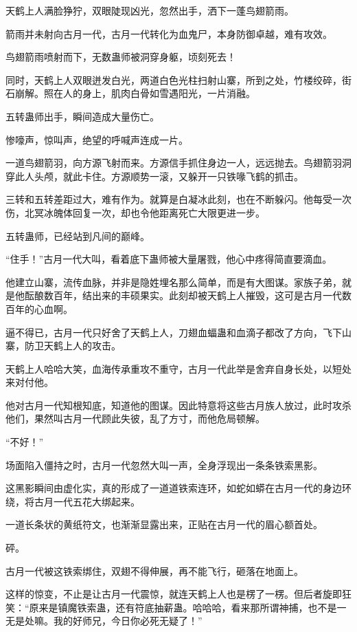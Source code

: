 
\begin{this_body}

天鹤上人满脸狰狞，双眼陡现凶光，忽然出手，洒下一蓬鸟翅箭雨。

箭雨并未射向古月一代，古月一代转化为血鬼尸，本身防御卓越，难有攻效。

鸟翅箭雨喷射而下，无数蛊师被洞穿身躯，顷刻死去！

同时，天鹤上人双眼迸发白光，两道白色光柱扫射山寨，所到之处，竹楼绞碎，街石崩解。照在人的身上，肌肉白骨如雪遇阳光，一片消融。

五转蛊师出手，瞬间造成大量伤亡。

惨嚎声，惊叫声，绝望的呼喊声连成一片。

一道鸟翅箭羽，向方源飞射而来。方源信手抓住身边一人，远远抛去。鸟翅箭羽洞穿此人头颅，就此卡住。方源顺势一滚，又躲开一只铁喙飞鹤的抓击。

三转和五转差距过大，难有作为。就算是白凝冰此刻，也在不断躲闪。他每受一次伤，北冥冰魄体回复一次，却也令他距离死亡大限更进一步。

五转蛊师，已经站到凡间的巅峰。

“住手！”古月一代大叫，看着底下蛊师被大量屠戮，他心中疼得简直要滴血。

他建立山寨，流传血脉，并非是隐姓埋名那么简单，而是有大图谋。家族子弟，就是他酝酿数百年，结出来的丰硕果实。此刻却被天鹤上人摧毁，这可是古月一代数百年的心血啊。

逼不得已，古月一代只好舍了天鹤上人，刀翅血蝠蛊和血滴子都改了方向，飞下山寨，防卫天鹤上人的攻击。

天鹤上人哈哈大笑，血海传承重攻不重守，古月一代此举是舍弃自身长处，以短处来对付他。

他对古月一代知根知底，知道他的图谋。因此特意将这些古月族人放过，此时攻杀他们，果然叫古月一代顾此失彼，乱了方寸，而他危局顿解。

“不好！”

场面陷入僵持之时，古月一代忽然大叫一声，全身浮现出一条条铁索黑影。

这黑影瞬间由虚化实，真的形成了一道道铁索连环，如蛇如蟒在古月一代的身边环绕，将古月一代五花大绑起来。

一道长条状的黄纸符文，也渐渐显露出来，正贴在古月一代的眉心额首处。

砰。

古月一代被这铁索绑住，双翅不得伸展，再不能飞行，砸落在地面上。

这样的惊变，不止是让古月一代震惊，就连天鹤上人也是楞了一楞。但后者旋即狂笑：“原来是镇魔铁索蛊，还有符底抽薪蛊。哈哈哈，看来那所谓神捕，也不是一无是处嘛。我的好师兄，今日你必死无疑了！”


\end{this_body}
